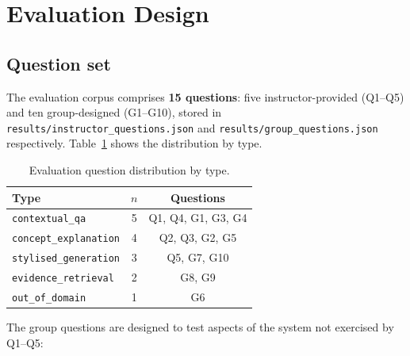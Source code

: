 \documentclass[10pt,conference]{IEEEtran}
\begin{document}
\section{Evaluation Design}
\label{sec:evaluation-design}


\subsection{Question set}

The evaluation corpus comprises \textbf{15 questions}: five
instructor-provided (Q1--Q5) and ten group-designed (G1--G10), stored
in \verb|results/instructor_questions.json| and
\verb|results/group_questions.json| respectively.
Table~\ref{tab:question-types} shows the distribution by type.

\begin{table}[h]
\centering
\caption{Evaluation question distribution by type.}
\label{tab:question-types}
\small
\begin{tabular}{lcc}
\toprule
Type & $n$ & Questions \\
\midrule
\texttt{contextual\_qa}       & 5 & Q1, Q4, G1, G3, G4 \\
\texttt{concept\_explanation} & 4 & Q2, Q3, G2, G5     \\
\texttt{stylised\_generation} & 3 & Q5, G7, G10         \\
\texttt{evidence\_retrieval}  & 2 & G8, G9              \\
\texttt{out\_of\_domain}      & 1 & G6                  \\
\bottomrule
\end{tabular}
\end{table}

The group questions are designed to test aspects of the system not
exercised by Q1--Q5:
\end{document}
